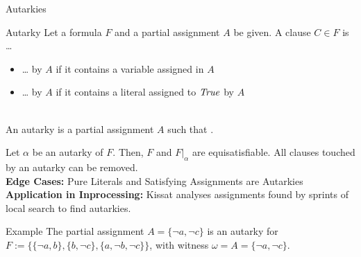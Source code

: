 \documentclass[t]{sdqbeamer}
\begin{document}
\begin{frame}{Autarkies}
\vspace*{-3.5ex}
\begin{block}{Autarky}
    Let a formula $F$ and a partial assignment $A$ be given. A clause $C \in F$ is \dots \\[1ex]
    \begin{itemize}\setlength{\itemsep}{0.5ex}
        \item \dots {} by $A$ if it contains a variable assigned in $A$
        \item \dots {} by $A$ if it contains a literal assigned to $\mathit{True}$ by $A$
    \end{itemize}~\\[-1ex]
    An autarky is a partial assignment $A$ such that .
\end{block}
%
Let $\alpha$ be an autarky of $F$. Then, $F$ and $F|_\alpha$ are equisatisfiable.
All clauses touched by an autarky can be removed.\\[1ex]
%
\textbf{Edge Cases:} Pure Literals and Satisfying Assignments are Autarkies\\
\textbf{Application in Inprocessing:} Kissat analyses assignments found by sprints of local search to find autarkies.\\[1ex]
%
\begin{exampleblock}{Example}
    The partial assignment $A = \{ \lnot a, \lnot c \}$ is an autarky for $F := \bigl\{\{ \lnot a, b \}, \{ b, \lnot c \}, \{ a, \lnot b, \lnot c \}\bigr\}$, with witness $\omega = A = \{ \lnot a, \lnot c \}$.
\end{exampleblock}
\end{frame}
\end{document}
